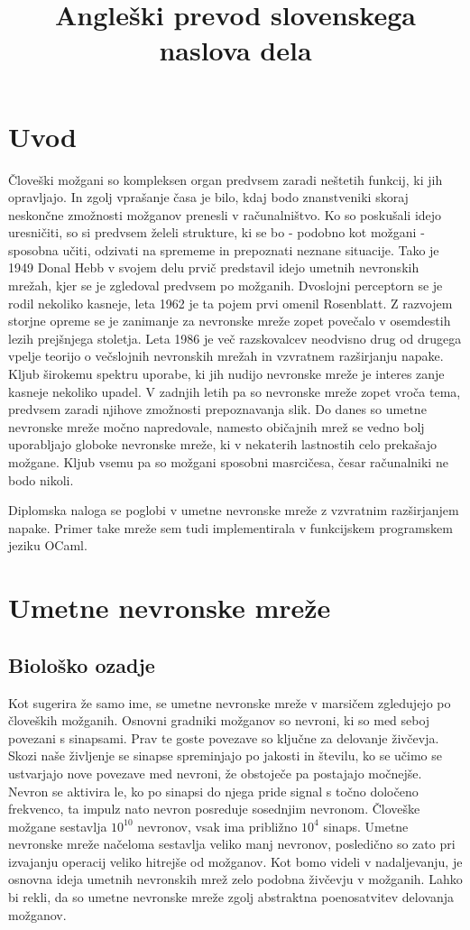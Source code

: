\documentclass[mat1]{fmfdelo}
\title{Angleški prevod slovenskega naslova dela}
\begin{document}
%
\section{Uvod}
%
Človeški možgani so kompleksen organ predvsem zaradi neštetih funkcij, ki jih opravljajo. In zgolj vprašanje časa je bilo, kdaj bodo znanstveniki skoraj neskončne zmožnosti možganov prenesli v računalništvo. Ko so poskušali idejo uresničiti, so si predvsem želeli strukture, ki se bo - podobno kot možgani - sposobna učiti, odzivati na sprememe in prepoznati neznane situacije. Tako je 1949 Donal Hebb v svojem delu prvič predstavil idejo umetnih nevronskih mrežah, kjer se je zgledoval predvsem po možganih. Dvoslojni perceptorn se je rodil nekoliko kasneje, leta 1962 je ta pojem prvi omenil Rosenblatt. Z razvojem storjne opreme se je zanimanje za nevronske mreže zopet povečalo v osemdestih lezih prejšnjega stoletja. Leta 1986 je več razskovalcev neodvisno drug od drugega vpelje teorijo o večslojnih nevronskih mrežah in vzvratnem razširjanju napake. Kljub širokemu spektru uporabe, ki jih nudijo nevronske mreže je interes zanje kasneje nekoliko upadel. V zadnjih letih pa so nevronske mreže zopet vroča tema, predvsem zaradi njihove zmožnosti prepoznavanja slik. Do danes so umetne nevronske mreže močno napredovale, namesto običajnih mrež se vedno bolj uporabljajo globoke nevronske mreže, ki v nekaterih lastnostih celo prekašajo možgane. Kljub vsemu pa so možgani sposobni masrcičesa, česar računalniki ne bodo nikoli.

Diplomska naloga se poglobi v umetne nevronske mreže z vzvratnim razširjanjem napake. Primer take mreže sem tudi implementirala v funkcijskem programskem jeziku OCaml. 
%
\section{Umetne nevronske mreže}
%
\subsection{Biološko ozadje}
Kot sugerira že samo ime, se umetne nevronske mreže v marsičem zgledujejo po človeških možganih. Osnovni gradniki možganov so nevroni, ki so med seboj povezani s sinapsami. Prav te goste povezave so ključne za delovanje živčevja. Skozi naše življenje se sinapse spreminjajo po jakosti in številu, ko se učimo se ustvarjajo nove povezave med nevroni, že obstoječe pa postajajo močnejše. Nevron se aktivira le,  ko po sinapsi do njega pride signal s točno določeno frekvenco, ta impulz nato nevron posreduje sosednjim nevronom. Človeške možgane sestavlja $10^{10}$ nevronov, vsak  ima približno $10^4$ sinaps. Umetne nevronske mreže načeloma sestavlja veliko manj nevronov, posledično so zato pri izvajanju operacij veliko hitrejše od možganov. Kot bomo videli v nadaljevanju, je osnovna ideja umetnih nevronskih mrež zelo podobna živčevju v možganih. Lahko bi rekli, da so umetne nevronske mreže zgolj abstraktna poenosatvitev delovanja možganov. 
\end{document}
